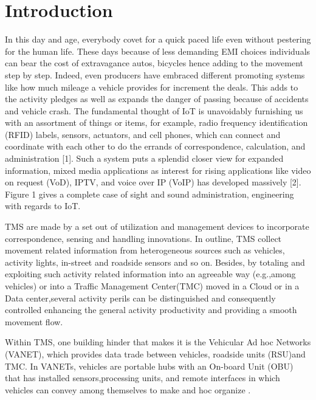 \documentclass[conference]{IEEEtran}
\begin{document}
\IEEEpeerreviewmaketitle

\section{Introduction}
In this day and age, everybody covet for a quick paced life even without pestering for the human life. These days because of less demanding EMI choices individuals can bear the cost of extravagance autos, bicycles hence adding to the movement step by step. Indeed, even producers have embraced different promoting systems like how much mileage a vehicle provides for increment the deals. This adds to the activity pledges as well as expands the danger of passing because of accidents and vehicle crash.
The fundamental thought of IoT is unavoidably furnishing us with an assortment of things or items, for example, radio frequency identification (RFID) labels, sensors, actuators, and cell phones, which can connect and coordinate with each other to do the errands of correspondence, calculation, and administration [1]. Such a system puts a splendid closer view for expanded information, mixed media applications as interest for rising applications like video on request (VoD), IPTV, and voice over IP (VoIP) has developed massively [2]. Figure 1 gives a complete case of sight and sound administration, engineering with regards to IoT.\cite{Multimedia:chao} 
  
  TMS are made by a set out of utilization and management devices to incorporate correspondence, sensing and handling innovations. In outline, TMS collect movement related information from heterogeneous sources such as vehicles, activity lights, in-street and roadside sensors and so on. Besides, by totaling and exploiting such activity related information into an agreeable way (e.g.,among vehicles)  \cite{VehicularNetworking:Karagiannis}  or into a Traffic Management Center(TMC) moved in a Cloud or in a Data center,several activity perils can be distinguished and consequently controlled enhancing the general activity productivity and providing a smooth movement flow.
  
  Within TMS, one building hinder that makes it is the Vehicular Ad hoc Networks (VANET), which provides data trade between vehicles, roadside units (RSU)and TMC. In VANETs, vehicles are portable hubs with an On-board Unit (OBU) that has installed sensors,processing units, and remote interfaces in which vehicles can convey among themselves to make and hoc organize \cite{2012efficient:villas}.
  
\end{document}
